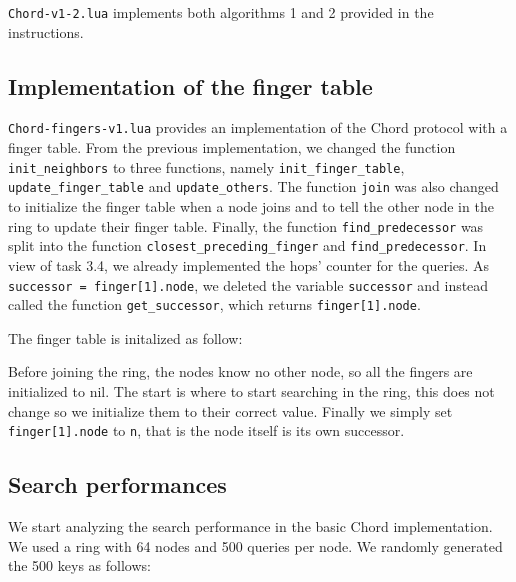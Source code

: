 \documentclass[a4paper, 11pt]{article}
\theoremstyle{plain}
\theoremstyle{definition}
\begin{document}
    \texttt{Chord-v1-2.lua} implements both algorithms 1 and 2 provided in the instructions.


  \subsection{Implementation of the finger table}
  \label{impl-fing-table}

    \texttt{Chord-fingers-v1.lua} provides an implementation of the Chord protocol with a finger table. From
    the previous implementation, we changed the function \texttt{init\_neighbors} to three functions, namely
    \texttt{init\_finger\_table}, \texttt{update\_finger\_table} and \texttt{update\_others}. The function
    \texttt{join} was also changed to initialize the finger table when a node joins and to tell the other node
    in the ring to update their finger table. Finally, the function \texttt{find\_predecessor} was split into
    the function \texttt{closest\_preceding\_finger} and \texttt{find\_predecessor}. In view of task 3.4, we
    already implemented the hops' counter for the queries. As \texttt{successor = finger[1].node}, we deleted
    the variable \texttt{successor} and instead called the function \texttt{get\_successor}, which returns \texttt{finger[1].node}.

    The finger table is initalized as follow:
    
    \begin{center}
      
    \end{center}

    Before joining the ring, the nodes know no other node, so all the fingers are initialized to nil. The
    start is where to start searching in the ring, this does not change so we initialize them to their correct
    value. Finally we simply set \texttt{finger[1].node} to \texttt{n}, that is the node itself is its own
    successor.


  \subsection{Search performances}
  \label{sec:search-performances}
  
    We start analyzing the search performance in the basic Chord implementation. We used a ring with 64 nodes
    and 500 queries per node. We randomly generated the 500 keys as follows:
    
\end{document}
